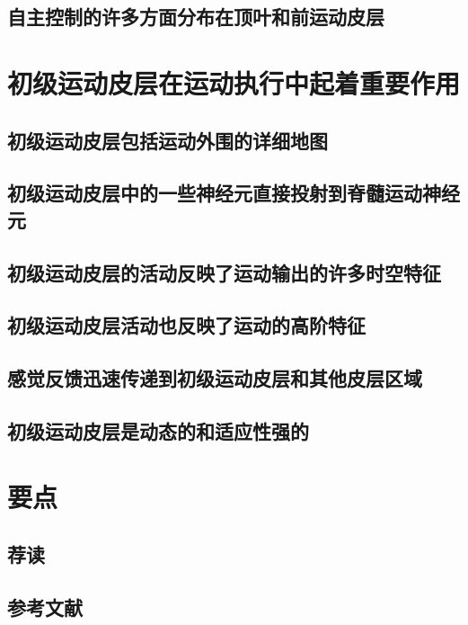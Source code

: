 \subsection{自主控制的许多方面分布在顶叶和前运动皮层}

\section{初级运动皮层在运动执行中起着重要作用}
\subsection{初级运动皮层包括运动外围的详细地图}
\subsection{初级运动皮层中的一些神经元直接投射到脊髓运动神经元}
\subsection{初级运动皮层的活动反映了运动输出的许多时空特征}
\subsection{初级运动皮层活动也反映了运动的高阶特征}
\subsection{感觉反馈迅速传递到初级运动皮层和其他皮层区域}
\subsection{初级运动皮层是动态的和适应性强的}

\section{要点}
\subsection{荐读}
\subsection{参考文献}